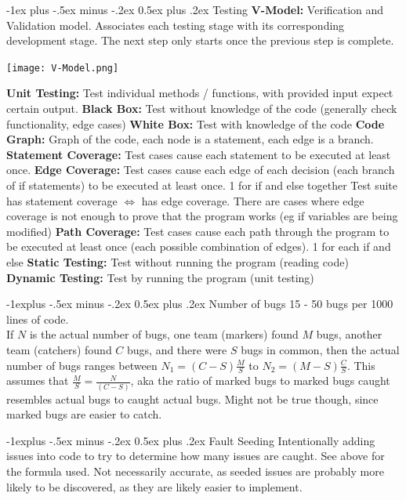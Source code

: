 \documentclass[letterpaper, 8pt]{extarticle}
\makeatletter
\renewcommand{\section}{\@startsection{section}{1}{0mm}%
                                {-1ex plus -.5ex minus -.2ex}%
                                {0.5ex plus .2ex}%
                                {\normalfont\normalsize\bfseries}}
\renewcommand{\subsection}{\@startsection{subsection}{2}{0mm}%
                                {-1explus -.5ex minus -.2ex}%
                                {0.5ex plus .2ex}%
                                {\normalfont\small\bfseries}}
\makeatother
\begin{document}
\begin{multicols*}{5}
  \section{Testing}
  \textbf{V-Model:} Verification and Validation model. Associates each testing stage with its corresponding development stage. The next
  step only starts once the previous step is complete.
  \begin{center}
    \texttt{[image: V-Model.png]}
  \end{center}
  \textbf{Unit Testing:} Test individual methods / functions, with provided input expect certain output.
  \textbf{Black Box:} Test without knowledge of the code (generally check functionality, edge cases)
  \textbf{White Box:} Test with knowledge of the code
  \textbf{Code Graph:} Graph of the code, each node is a statement, each edge is a branch.
  \textbf{Statement Coverage:} Test cases cause each statement to be executed at least once.
  \textbf{Edge Coverage:} Test cases cause each edge of each decision (each branch of if statements) to be executed at least once. 1 for if and else together
  Test suite has statement coverage $\Leftrightarrow$ has edge coverage.
  There are cases where edge coverage is not enough to prove that the program works
  (eg if variables are being modified)
  \textbf{Path Coverage:} Test cases cause each path through the program to be executed at least once (each possible combination of edges). 1 for each if and else
  \textbf{Static Testing:} Test without running the program (reading code)
  \textbf{Dynamic Testing:} Test by running the program (unit testing)

  \subsection{Number of bugs}
  15 - 50 bugs per 1000 lines of code. \\
  If $N$ is the actual number of bugs, one team (markers) found $M$ bugs, another team (catchers) found $C$ bugs, and there were $S$ bugs in common,
  then the actual number of bugs ranges between $N_1 = (C - S) \frac{M}{S}$ to $N_2 = (M - S) \frac{C}{S}$.
  This assumes that $\frac{M}{S} = \frac{N}{(C-S)}$, aka the ratio of marked bugs to marked bugs caught resembles actual bugs to caught actual bugs. Might not be true though, since marked bugs are easier to catch.

  \subsection{Fault Seeding}
  Intentionally adding issues into code to try to determine how many issues are caught. See above for the formula used.
  Not necessarily accurate, as seeded issues are probably more likely to be discovered, as they are likely easier to implement. 

\end{multicols*}
\end{document}
